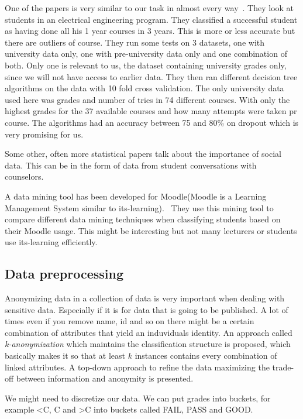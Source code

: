 \bigskip\noindent
One of the papers is very similar to our task in almost every way~\cite{7}.
They look at students in an electrical engineering program. 
They classified a successful student as having done all his 1 year courses in 3 years. 
This is more or less accurate but there are outliers of course. 
They run some tests on 3 datasets, one with university data only, one with pre-university data only and one combination of both. 
Only one is relevant to us, the dataset containing university grades only, since we will not have access to earlier data. 
They then ran different decision tree algorithms on the data with 10 fold cross validation. 
The only university data used here was grades and number of tries in 74 different courses. 
With only the highest grades for the 37 available courses and how many attempts were taken pr course.
The algorithms had an accuracy between 75 and 80\% on dropout which is very promising for us.

\bigskip\noindent
Some other, often more statistical papers talk about the importance of social data. 
This can be in the form of data from student conversations with counselors.~\cite{11} 

\bigskip\noindent
A data mining tool has been developed for Moodle(Moodle is a Learning Management System similar to its-learning).~\cite{12} 
They use this mining tool to compare different data mining techniques when classifying students based on their Moodle usage. 
This might be interesting but not many lecturers or students use its-learning efficiently. 

\subsection{Data preprocessing}
Anonymizing data in a collection of data is very important when dealing with sensitive data. 
Especially if it is for data that is going to be published. 
A lot of times even if you remove name, id and so on there might be a certain combination of attributes that yield an induviduals identity.
An approach called \textit{k-anonymization} which maintains the classification structure is proposed, 
which basically makes it so that at least $k$ instances contains every combination of linked attributes. 
A top-down approach to refine the data maximizing the trade-off between information and anonymity is presented.~\cite{14}

\bigskip\noindent
We might need to discretize our data.
We can put grades into buckets, for example \textless C, C and \textgreater C into buckets called FAIL, PASS and GOOD.~\cite{12}

